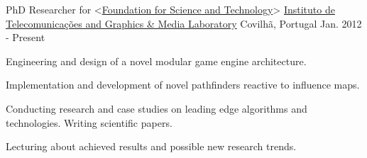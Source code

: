 

\begin{cventries}

  \cventry
    {PhD Researcher for <\href{http://www.fct.pt/index.phtml.en}{Foundation for Science and Technology}>} %
    {\href{http://www.it.ubi.pt/medialab}{Instituto de Telecomunica\c{c}\~{o}es and Graphics \& Media Laboratory}} %
    {Covilh\~a, Portugal} %
    {Jan. 2012 - Present} %
    {
      \begin{cvitems} %
      \item {Engineering and design of a novel modular game engine architecture.}
      \item {Implementation and development of novel pathfinders reactive to influence maps.}%
      \item {Conducting research and case studies on leading edge algorithms and technologies. Writing scientific papers.}
      \item {Lecturing about achieved results and possible new research trends.}
      \end{cvitems}
    }  
    

\end{cventries}
